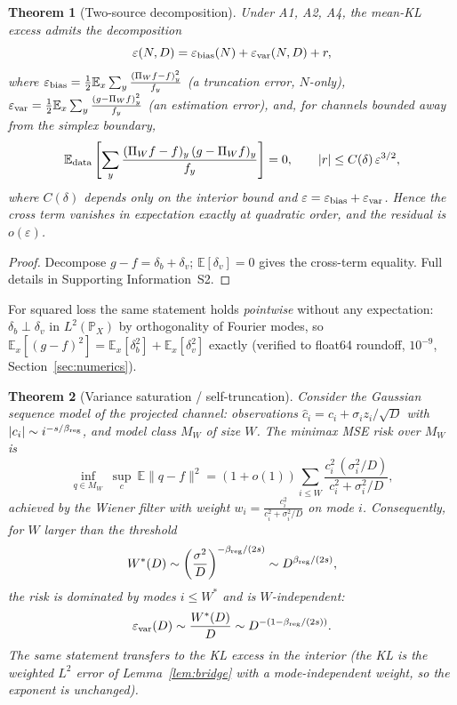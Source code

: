 \documentclass[12pt]{article}
\newcommand{\eps}{\varepsilon}
\newcommand{\E}{\mathbb{E}}
\newcommand{\Prob}{\mathbb{P}}
\newcommand{\PiW}{\Pi_{W}}
\newtheorem{theorem}{Theorem}[section]
\theoremstyle{remark}
\begin{document}
\begin{theorem}[Two-source decomposition]
\label{thm:additive}
Under A1, A2, A4, the mean-KL excess admits the decomposition
\begin{equation}
  \eps(N,D)=\eps_{\rm bias}(N)+\eps_{\rm var}(N,D)+r,
  \label{eq:decom}
\end{equation}
where $\eps_{\rm bias}=\frac12\E_x\sum_y
\frac{(\PiW f-f)_y^2}{f_y}$ (a truncation error, $N$-only),
$\eps_{\rm var}=\frac12\E_x\sum_y
\frac{(g-\PiW f)_y^2}{f_y}$ (an estimation error), and, for channels bounded
away from the simplex boundary,
\begin{equation}
  \E_{\rm data}\left[\sum_y\frac{(\PiW f-f)_y\,(g-\PiW f)_y}{f_y}\right]=0,
  \qquad |r|\le C(\delta)\,\eps^{3/2},
  \label{eq:cross}
\end{equation}
where $C(\delta)$ depends only on the interior bound and
$\eps=\eps_{\rm bias}+\eps_{\rm var}$. Hence the cross term vanishes in
expectation \emph{exactly} at quadratic order, and the residual is
$o(\eps)$.
\end{theorem}

\begin{proof}
Decompose $g-f=\delta_b+\delta_v$; $\E[\delta_v]=0$ gives the cross-term
equality. Full details in Supporting Information~S2.
\end{proof}

For squared loss the same statement holds \emph{pointwise} without any
expectation: $\delta_b\perp\delta_v$ in $L^2(\Prob_X)$ by orthogonality of
Fourier modes, so $\E_x[(g-f)^2]=\E_x[\delta_b^2]+\E_x[\delta_v^2]$ exactly
(verified to float64 roundoff, $10^{-9}$, Section~\ref{sec:numerics}).

\begin{theorem}[Variance saturation / self-truncation]
\label{thm:saturation}
Consider the Gaussian sequence model of the projected channel:
observations $\hat c_i=c_i+\sigma_i z_i/\sqrt{D}$ with $|c_i|\sim
i^{-s/\beta_{\rm reg}}$, and model class $M_W$ of size $W$. The minimax MSE
risk over $M_W$ is
\begin{equation}
  \inf_{q\in M_W}\ \sup_{c}\ \E\|q-f\|^2
  = (1+o(1))\sum_{i\le W}
  \frac{c_i^2\,(\sigma_i^2/D)}{c_i^2+\sigma_i^2/D},
  \label{eq:minimax}
\end{equation}
achieved by the Wiener filter with weight $w_i=
\frac{c_i^2}{c_i^2+\sigma_i^2/D}$ on mode $i$. Consequently, for $W$ larger
than the threshold
\begin{equation}
  W^*(D)\sim \left(\frac{\sigma^2}{D}\right)^{-\beta_{\rm reg}/(2s)}
  \sim D^{\beta_{\rm reg}/(2s)},
  \label{eq:Wstar}
\end{equation}
the risk is dominated by modes $i\le W^*$ and is $W$-independent:
\begin{equation}
  \eps_{\rm var}(D)\sim \frac{W^*(D)}{D}\sim
  D^{-(1-\beta_{\rm reg}/(2s))}.
  \label{eq:varstar}
\end{equation}
The same statement transfers to the KL excess in the interior (the KL is the
weighted $L^2$ error of Lemma~\ref{lem:bridge} with a mode-independent
weight, so the exponent is unchanged).
\end{theorem}
\end{document}
